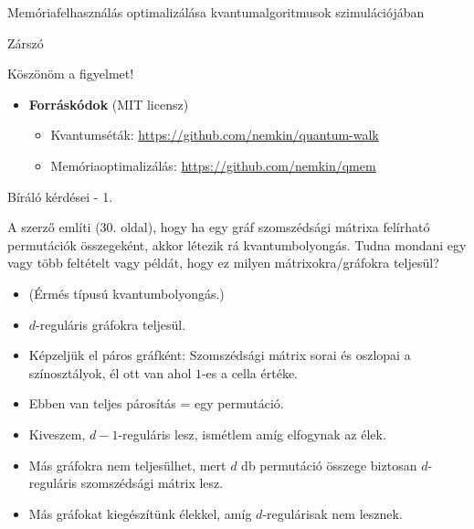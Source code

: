 \documentclass[aspectratio=169]{beamer}
\begin{document}
\begin{frame}{Memóriafelhasználás optimalizálása kvantumalgoritmusok szimulációjában}

\end{frame}

\begin{frame}{Zárszó}

\begin{center}
\begin{LARGE}
Köszönöm a figyelmet!
\end{LARGE}
\end{center}

\begin{itemize}
\item \textbf{Forráskódok} (MIT licensz)
\begin{itemize}
\item Kvantumséták: \href{https://github.com/nemkin/quantum-walk}{\color{blue}https://github.com/nemkin/quantum-walk}
\item Memóriaoptimalizálás: \href{https://github.com/nemkin/qmem}{\color{blue}https://github.com/nemkin/qmem}
\end{itemize}
\end{itemize}
\end{frame}

\begin{frame}{Bíráló kérdései - 1.}

A szerző említi (30. oldal), hogy ha egy gráf szomszédsági mátrixa felírható permutációk összegeként, akkor létezik rá kvantumbolyongás. Tudna mondani egy vagy több feltételt vagy példát, hogy ez milyen mátrixokra/gráfokra teljesül?

\begin{itemize}
  \item (Érmés típusú kvantumbolyongás.)
  \item $d$-reguláris gráfokra teljesül.
  \item Képzeljük el páros gráfként: Szomszédsági mátrix sorai és oszlopai a színosztályok, él ott van ahol $1$-es a cella értéke.
  \item Ebben van teljes párosítás = egy permutáció.
  \item Kiveszem, $d-1$-reguláris lesz, ismétlem amíg elfogynak az élek.
  \item Más gráfokra nem teljesülhet, mert $d$ db permutáció összege biztosan $d$-reguláris szomszédsági mátrix lesz.
  \item Más gráfokat kiegészítünk élekkel, amíg $d$-regulárisak nem lesznek.
\end{itemize}

\end{frame}
\end{document}
